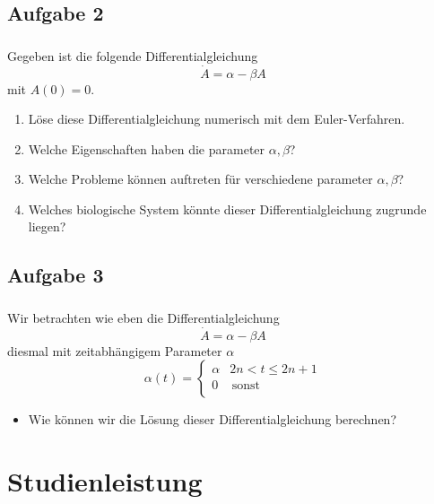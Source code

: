 \subsection{Aufgabe 2}
\label{subsec:exercise-1}
\begin{frame}
    \frametitle{\insertsubsection}
    Gegeben ist die folgende Differentialgleichung
    \[\dot{A} = \alpha - \beta A\]
    mit $A(0)=0$.
    \begin{enumerate}[<+->]
        \item Löse diese Differentialgleichung numerisch mit dem Euler-Verfahren.
        \item Welche Eigenschaften haben die parameter $\alpha,\beta$?
        \item Welche Probleme können auftreten für verschiedene parameter $\alpha,\beta$?
        \item Welches biologische System könnte dieser Differentialgleichung zugrunde liegen?
    \end{enumerate}

\end{frame}


\subsection{Aufgabe 3}
\label{subsec:exercise-1}
\begin{frame}
    \frametitle{\insertsubsection}
    Wir betrachten wie eben die Differentialgleichung
    \[\dot{A} = \alpha - \beta A\]
    diesmal mit zeitabhängigem Parameter $\alpha$
    \[\alpha(t) = \left\{\begin{array}{ll}
        \alpha & 2n < t \leq 2n+1 \\
        0 & \, \textrm{sonst} \\
        \end{array}\right.\]
    \begin{itemize}[<+->]
        \item Wie können wir die Lösung dieser Differentialgleichung berechnen?
    \end{itemize}
\end{frame}


\section{Studienleistung}
